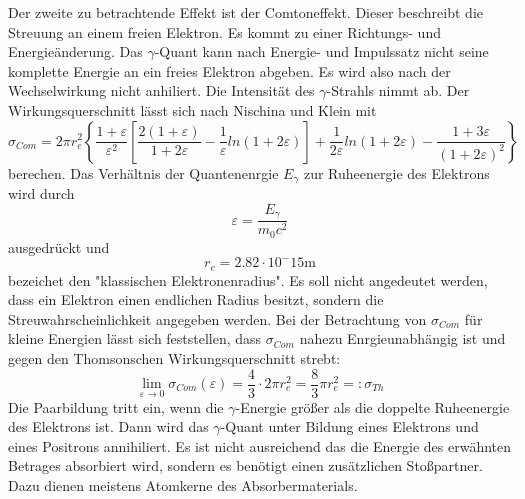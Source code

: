 Der zweite zu betrachtende Effekt ist der Comtoneffekt.
Dieser beschreibt die Streuung an einem freien Elektron.
Es kommt zu einer Richtungs- und Energieänderung.
Das $\gamma$-Quant kann nach Energie- und Impulssatz nicht seine komplette Energie an ein freies Elektron abgeben.
Es wird also nach der Wechselwirkung nicht anhiliert.
Die Intensität des $\gamma$-Strahls nimmt ab.
Der Wirkungsquerschnitt lässt sich nach Nischina und Klein mit
\begin{equation}
  \sigma_{Com} = 2 \pi r_e^2 \left\{\frac{1+\varepsilon}{\varepsilon^2}\left[\frac{2(1+\varepsilon)}{1+2\varepsilon} - \frac{1}{\varepsilon}ln(1+2\varepsilon)\right] + \frac{1}{2\varepsilon}ln(1+2\varepsilon) - \frac{1+3\varepsilon}{(1+2\varepsilon)^2} \right\}
\end{equation}
berechen.
Das Verhältnis der Quantenenrgie $E_\gamma$ zur Ruheenergie des Elektrons wird durch
\begin{equation}
  \varepsilon = \frac{E_\gamma}{m_0 c^2}
\end{equation}
ausgedrückt und
\begin{equation}
  r_e= 2.82 \cdot 10^-15 \si{\meter}
\end{equation}
bezeichet den "klassischen Elektronenradius".
Es soll nicht angedeutet werden, dass ein Elektron einen endlichen Radius besitzt, sondern die Streuwahrscheinlichkeit angegeben werden.
Bei der Betrachtung von $\sigma_{Com}$ für kleine Energien lässt sich feststellen, dass $\sigma_{Com}$ nahezu Enrgieunabhängig ist und gegen den Thomsonschen Wirkungsquerschnitt strebt:
\begin{equation}
  \lim_{\varepsilon \rightarrow 0} \sigma_{Com}(\varepsilon) = \frac{4}{3} \cdot 2 \pi r_e^2 = \frac{8}{3}\pi r_e^2 =: \sigma_{Th}
\end{equation}
Die Paarbildung tritt ein, wenn die $\gamma$-Energie größer als die doppelte Ruheenergie des Elektrons ist.
Dann wird das $\gamma$-Quant unter Bildung eines Elektrons und eines Positrons annihiliert.
Es ist nicht ausreichend das die Energie des erwähnten Betrages absorbiert wird, sondern es benötigt einen zusätzlichen Stoßpartner.
Dazu dienen meistens Atomkerne des Absorbermaterials.

